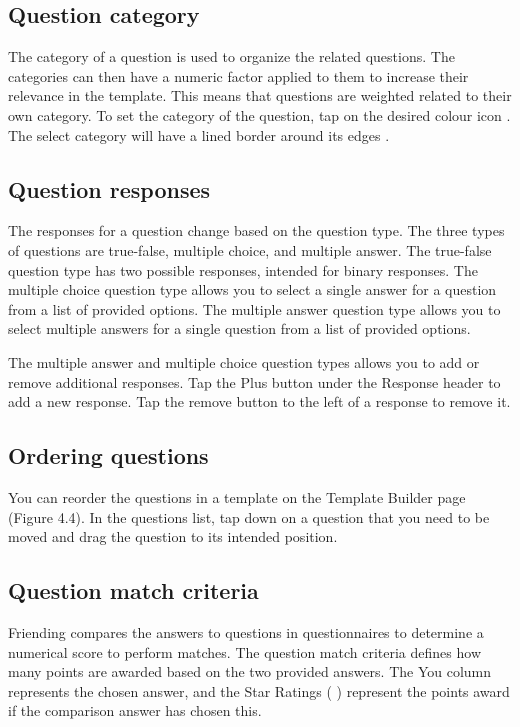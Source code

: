 \documentclass[a4paper,11pt,titlepage]{scrartcl}
\newcommand{\textapp}[1]{{\fontfamily{cmss}\selectfont#1}}
\newcommand{\Friending}{\textapp{Friending}}
\begin{document}
\subsection{Question category}
\label{sec:qcategory}
The category of a question is used to organize the related questions.  The categories can then have a numeric factor applied to them to increase their relevance in the template.  This means that questions are weighted related to their own category.  To set the category of the question, tap on the desired colour icon  .  The select category will have a lined border around its edges  .

\subsection{Question responses}
\label{sec:qresponses}
The responses for a question change based on the question type.  The three types of questions are  true-false, multiple choice, and multiple answer.  The true-false question type has two possible responses, intended for binary responses.  The multiple choice question type allows you to select a single answer for a question from a list of provided options. The multiple answer question type allows you to select multiple answers for a single question from a list of provided options. 

The multiple answer and multiple choice question types allows you to add or remove additional responses. Tap the Plus button   under the Response header to add a new response. Tap the remove button  to the left of a response to remove it.

\subsection{Ordering questions}
\label{sec:qordering}
You can reorder the questions in a template on the Template Builder page (Figure 4.4). In the questions list, tap down on a question that you need to be moved and drag the question to its intended position. 

\subsection{Question match criteria}
\label{sec:matchcriterua}
\Friending{} compares the answers to questions in questionnaires to determine a numerical score to perform matches.  The question match criteria defines how many points are awarded based on the two provided answers.   The You column represents the chosen answer, and the Star Ratings ( ) represent the points award if the comparison answer has chosen this.  
\end{document}
